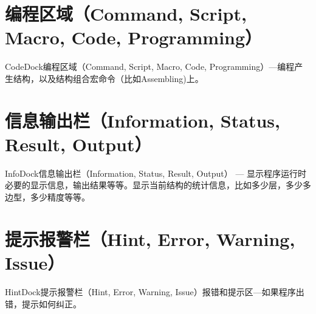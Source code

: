\section{编程区域（Command, Script, Macro, Code, Programming）} \label{SectMaskCodeDock}
CodeDock编程区域（Command, Script, Macro, Code, Programming）---编程产生结构，以及结构组合宏命令（比如Assembling)上。

\section{信息输出栏（Information, Status, Result, Output）} \label{SectMaskInfoDock}
InfoDock信息输出栏（Information, Status, Result, Output） --- 显示程序运行时必要的显示信息，输出结果等等。显示当前结构的统计信息，比如多少层，多少多边型，多少精度等等。

\section{提示报警栏（Hint, Error, Warning, Issue）} \label{SectMaskHintDock}
HintDock提示报警栏（Hint, Error, Warning, Issue）报错和提示区---如果程序出错，提示如何纠正。

